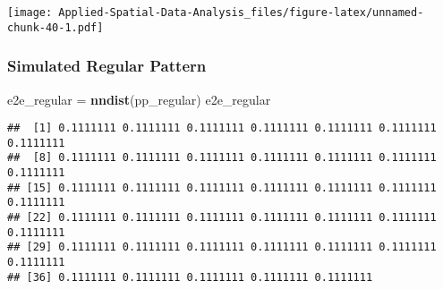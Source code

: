 \documentclass[
]{book}
\newenvironment{Shaded}{\begin{snugshade}}{\end{snugshade}}
\newcommand{\CommentTok}[1]{\textcolor[rgb]{0.56,0.35,0.01}{\textit{#1}}}
\newcommand{\ControlFlowTok}[1]{\textcolor[rgb]{0.13,0.29,0.53}{\textbf{#1}}}
\newcommand{\DataTypeTok}[1]{\textcolor[rgb]{0.13,0.29,0.53}{#1}}
\newcommand{\DecValTok}[1]{\textcolor[rgb]{0.00,0.00,0.81}{#1}}
\newcommand{\KeywordTok}[1]{\textcolor[rgb]{0.13,0.29,0.53}{\textbf{#1}}}
\newcommand{\NormalTok}[1]{#1}
\newcommand{\OperatorTok}[1]{\textcolor[rgb]{0.81,0.36,0.00}{\textbf{#1}}}
\newcommand{\StringTok}[1]{\textcolor[rgb]{0.31,0.60,0.02}{#1}}
\begin{document}
\begin{Shaded}
\end{Shaded}

\texttt{[image: Applied-Spatial-Data-Analysis\_files/figure-latex/unnamed-chunk-40-1.pdf]}

\hypertarget{simulated-regular-pattern-1}{%
\subsubsection{Simulated Regular Pattern}\label{simulated-regular-pattern-1}}

\begin{Shaded}
\begin{Highlighting}[]
\NormalTok{e2e_regular =}\StringTok{ }\KeywordTok{nndist}\NormalTok{(pp_regular)}
\NormalTok{e2e_regular}
\end{Highlighting}
\end{Shaded}

\begin{verbatim}
##  [1] 0.1111111 0.1111111 0.1111111 0.1111111 0.1111111 0.1111111 0.1111111
##  [8] 0.1111111 0.1111111 0.1111111 0.1111111 0.1111111 0.1111111 0.1111111
## [15] 0.1111111 0.1111111 0.1111111 0.1111111 0.1111111 0.1111111 0.1111111
## [22] 0.1111111 0.1111111 0.1111111 0.1111111 0.1111111 0.1111111 0.1111111
## [29] 0.1111111 0.1111111 0.1111111 0.1111111 0.1111111 0.1111111 0.1111111
## [36] 0.1111111 0.1111111 0.1111111 0.1111111 0.1111111
\end{verbatim}
\end{document}
